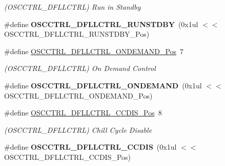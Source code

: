 \begin{DoxyCompactItemize}
\begin{DoxyCompactList}\small\item\em (O\+S\+C\+C\+T\+R\+L\+\_\+\+D\+F\+L\+L\+C\+T\+R\+L) Run in Standby \end{DoxyCompactList}\item 
\hypertarget{group___s_a_m_l21___o_s_c_c_t_r_l_gac1059878a8148c06642a8017849f7347}{}\#define {\bfseries O\+S\+C\+C\+T\+R\+L\+\_\+\+D\+F\+L\+L\+C\+T\+R\+L\+\_\+\+R\+U\+N\+S\+T\+D\+B\+Y}~(0x1ul $<$$<$ O\+S\+C\+C\+T\+R\+L\+\_\+\+D\+F\+L\+L\+C\+T\+R\+L\+\_\+\+R\+U\+N\+S\+T\+D\+B\+Y\+\_\+\+Pos)\label{group___s_a_m_l21___o_s_c_c_t_r_l_gac1059878a8148c06642a8017849f7347}

\item 
\hypertarget{group___s_a_m_l21___o_s_c_c_t_r_l_ga1438e9343c53d68f11b25c01cc5d1e7a}{}\#define \hyperlink{group___s_a_m_l21___o_s_c_c_t_r_l_ga1438e9343c53d68f11b25c01cc5d1e7a}{O\+S\+C\+C\+T\+R\+L\+\_\+\+D\+F\+L\+L\+C\+T\+R\+L\+\_\+\+O\+N\+D\+E\+M\+A\+N\+D\+\_\+\+Pos}~7\label{group___s_a_m_l21___o_s_c_c_t_r_l_ga1438e9343c53d68f11b25c01cc5d1e7a}

\begin{DoxyCompactList}\small\item\em (O\+S\+C\+C\+T\+R\+L\+\_\+\+D\+F\+L\+L\+C\+T\+R\+L) On Demand Control \end{DoxyCompactList}\item 
\hypertarget{group___s_a_m_l21___o_s_c_c_t_r_l_ga5faa67f1a5c96aa76ebe1545a00200a9}{}\#define {\bfseries O\+S\+C\+C\+T\+R\+L\+\_\+\+D\+F\+L\+L\+C\+T\+R\+L\+\_\+\+O\+N\+D\+E\+M\+A\+N\+D}~(0x1ul $<$$<$ O\+S\+C\+C\+T\+R\+L\+\_\+\+D\+F\+L\+L\+C\+T\+R\+L\+\_\+\+O\+N\+D\+E\+M\+A\+N\+D\+\_\+\+Pos)\label{group___s_a_m_l21___o_s_c_c_t_r_l_ga5faa67f1a5c96aa76ebe1545a00200a9}

\item 
\hypertarget{group___s_a_m_l21___o_s_c_c_t_r_l_ga02071e87fc79b1ba49e407e9f3b696e4}{}\#define \hyperlink{group___s_a_m_l21___o_s_c_c_t_r_l_ga02071e87fc79b1ba49e407e9f3b696e4}{O\+S\+C\+C\+T\+R\+L\+\_\+\+D\+F\+L\+L\+C\+T\+R\+L\+\_\+\+C\+C\+D\+I\+S\+\_\+\+Pos}~8\label{group___s_a_m_l21___o_s_c_c_t_r_l_ga02071e87fc79b1ba49e407e9f3b696e4}

\begin{DoxyCompactList}\small\item\em (O\+S\+C\+C\+T\+R\+L\+\_\+\+D\+F\+L\+L\+C\+T\+R\+L) Chill Cycle Disable \end{DoxyCompactList}\item 
\hypertarget{group___s_a_m_l21___o_s_c_c_t_r_l_ga98780e77fa71c71b39b8d435a3161c6f}{}\#define {\bfseries O\+S\+C\+C\+T\+R\+L\+\_\+\+D\+F\+L\+L\+C\+T\+R\+L\+\_\+\+C\+C\+D\+I\+S}~(0x1ul $<$$<$ O\+S\+C\+C\+T\+R\+L\+\_\+\+D\+F\+L\+L\+C\+T\+R\+L\+\_\+\+C\+C\+D\+I\+S\+\_\+\+Pos)\label{group___s_a_m_l21___o_s_c_c_t_r_l_ga98780e77fa71c71b39b8d435a3161c6f}


\end{DoxyCompactItemize}
